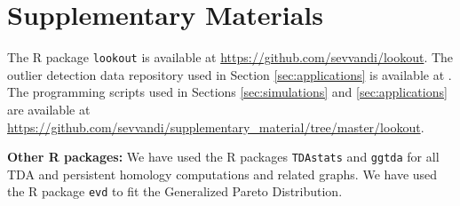 \documentclass[11pt,a4paper,]{article}
\theoremstyle{definition}
\theoremstyle{definition}
\theoremstyle{definition}
\theoremstyle{remark}
\begin{document}
\hypertarget{supplementary-materials}{%
\section{\texorpdfstring{Supplementary Materials \label{sec:suppmat}}{Supplementary Materials }}\label{supplementary-materials}}

The R package \texttt{lookout} is available at \url{https://github.com/sevvandi/lookout}.
The outlier detection data repository used in Section \ref{sec:applications} is available at \textcite{datasets}.
The programming scripts used in Sections \ref{sec:simulations} and \ref{sec:applications} are available at \url{https://github.com/sevvandi/supplementary_material/tree/master/lookout}.

\textbf{Other R packages:} We have used the R packages \texttt{TDAstats} \autocite{tdastatsR} and \texttt{ggtda} \autocite{ggdta} for all TDA and persistent homology computations and related graphs. We have used the R package \texttt{evd} \autocite{evdR} to fit the Generalized Pareto Distribution.

\printbibliography
\end{document}

